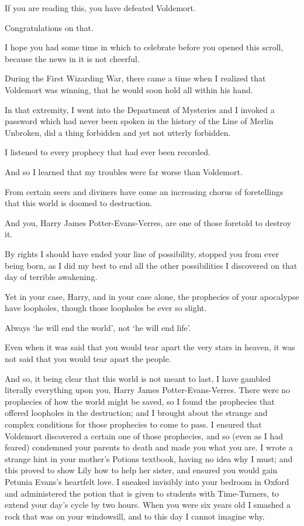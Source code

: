 \begin{writtenNote}

If you are reading this, you have defeated Voldemort.

Congratulations on that.

I hope you had some time in which to celebrate before you opened this scroll, because the news in it is not cheerful.

During the First Wizarding War, there came a time when I realized that Voldemort was winning, that he would soon hold all within his hand.

In that extremity, I went into the Department of Mysteries and I invoked a password which had never been spoken in the history of the Line of Merlin Unbroken, did a thing forbidden and yet not utterly forbidden.

I listened to every prophecy that had ever been recorded.

And so I learned that my troubles were far worse than Voldemort.

From certain seers and diviners have come an increasing chorus of foretellings that this world is doomed to destruction.

And you, Harry James Potter-Evans-Verres, are one of those foretold to destroy it.

By rights I should have ended your line of possibility, stopped you from ever being born, as I did my best to end all the other possibilities I discovered on that day of terrible awakening.

Yet in your case, Harry, and in your case alone, the prophecies of your apocalypse have loopholes, though those loopholes be ever so slight.

Always `he will end the world', not `he will end life'.

Even when it was said that you would tear apart the very stars in heaven, it was not said that you would tear apart the people.

And so, it being clear that this world is not meant to last, I have gambled literally everything upon you, Harry James Potter-Evans-Verres. There were no prophecies of how the world might be saved, so I found the prophecies that offered loopholes in the destruction; and I brought about the strange and complex conditions for those prophecies to come to pass. I ensured that Voldemort discovered a certain one of those prophecies, and so (even as I had feared) condemned your parents to death and made you what you are. I wrote a strange hint in your mother's Potions textbook, having no idea why I must; and this proved to show Lily how to help her sister, and ensured you would gain Petunia Evans's heartfelt love. I sneaked invisibly into your bedroom in Oxford and administered the potion that is given to students with Time-Turners, to extend your day's cycle by two hours. When you were six years old I smashed a rock that was on your windowsill, and to this day I cannot imagine why.


\end{writtenNote}
